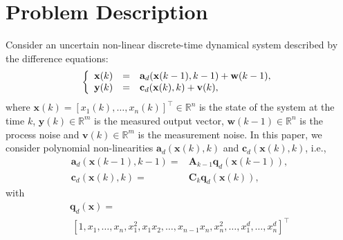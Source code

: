 \documentclass[twocolumn]{autart}
\begin{document}



\section{Problem Description} \label{Sec:probdes}\vspace{-1mm}
Consider an uncertain non-linear discrete-time  dynamical system described by the difference equations:
\begin{equation}
\label{eq:setmembersys} \left\{
\begin{array}[pos]{rcl}
   \mathbf{x}(k)&=& \mathbf{a}_d(\mathbf{x}(k-1),k-1)+\mathbf{w}(k-1),\\
   \mathbf{y}(k)&=&\mathbf{c}_d(\mathbf{x}(k),k)+\mathbf{v}(k),\\
\end{array}\right.
\end{equation}
where $\mathbf{x}(k)=[x_1(k),\dots,x_n(k)]^\top\in \mathbb{R}^n$ is the state of the system  at the time $k$,
$\mathbf{y}(k)\in \mathbb{R}^m$ is the measured output vector, $\mathbf{w}(k-1) \in \mathbb{R}^n$ is the
process noise and $\mathbf{v}(k) \in \mathbb{R}^m$ is the measurement noise.
In this paper, we consider polynomial non-linearities $\mathbf{a}_d(\mathbf{x}(k),k)$ and $\mathbf{c}_d(\mathbf{x}(k),k)$, i.e.,
\begin{subequations} \label{eq:setmembersysa1tot}
\begin{align}
 \mathbf{a}_d(\mathbf{x}(k-1),k-1)=&\mathbf{A}_{k-1} \mathbf{q}_d(\mathbf{x}(k-1)), \label{eq:setmembersysa1} \\
 \mathbf{c}_d(\mathbf{x}(k),k)=&\mathbf{C}_k \mathbf{q}_d(\mathbf{x}(k)), \label{eq:setmembersysa2}
 \end{align}
\end{subequations}
with
\begin{equation}
\label{eq:moments}
\begin{array}{l}
 \mathbf{q}_d(\mathbf{x})= \\
~[1,x_1,\dots,x_n,x_1^2,x_1x_2,\dots,x_{n-1}x_{n},x_n^2,\dots,x_1^d,\dots,x_n^d]^\top
 \end{array}
\end{equation}
\end{document}
